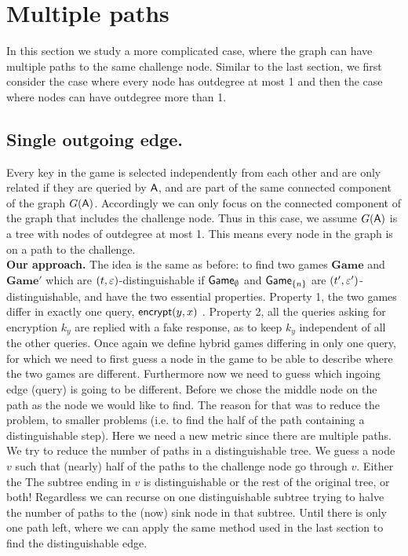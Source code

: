 \documentclass{article}
\def\A{{\sf A}}
\newcommand{\encrypt}{{\sf encrypt}}
\newcommand{\game}{{\sf Game}}
\newcommand{\dgame}{{\mathbf{Game}}}
\begin{document}
\section{Multiple paths}

In this section we study a more complicated case, where the graph can have multiple paths to the same challenge node. Similar to the last section, we first consider the case where every node has outdegree at most 1 and then the case where nodes can have outdegree more than 1.

\subsection{Single outgoing edge.}
Every key in the game is selected independently from each other and are only related if they are queried by $\A$, and are part of the same connected component of the graph $G(\A)$. Accordingly we can only focus on the connected component of the graph that includes the challenge node. Thus in this case, we assume $G(\A)$ is a tree with nodes of outdegree at most 1. This means every node in the graph is on a path to the challenge. \\


\noindent \textbf{Our approach.}
The idea is the same as before: to find two games $\dgame$ and $\dgame'$ which are $(t,\varepsilon)$-distinguishable if $\game_{\emptyset}$ and $\game_{\{n\}}$ are $(t',\varepsilon')$-distinguishable, and have the two essential properties. Property 1, the two games differ in exactly one query, $\encrypt(y,x)$ . Property 2, all the queries asking for encryption $k_y$ are replied with a fake response, as to keep $k_y$ independent of all the other queries. Once again we define hybrid games differing in only one query, for which we need to first guess a node in the game to be able to describe where the two games are different. Furthermore now we need to guess which ingoing edge (query) is  going to be different. Before we chose the middle node on the path as the node  we would like to find. The reason for that was to reduce the problem, to smaller problems (i.e. to find the half of the path containing a distinguishable step). Here we need a new metric since there are multiple paths. We try to reduce the number of paths in a distinguishable tree. We guess a node $v$ such that (nearly) half of the paths to the challenge node go through $v$. Either the The subtree ending in $v$ is distinguishable or the rest of the original tree,  or both! Regardless we can recurse on one distinguishable subtree trying to halve the number of paths to the (now) sink node in that subtree. Until there is only one path left, where we can apply the same method used in the last section to find the distinguishable edge. \\
\end{document}
